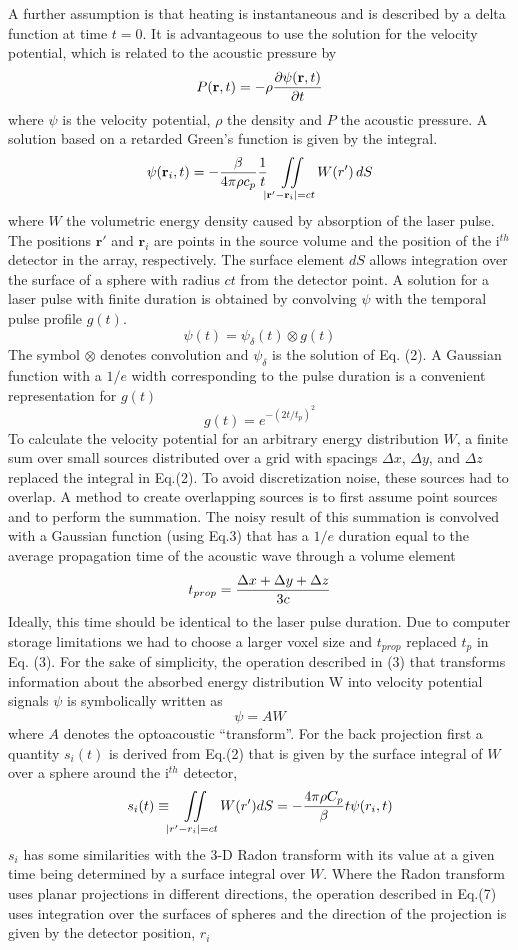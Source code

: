 ﻿\documentclass{article}
\begin{document}
A further assumption 
is that heating is instantaneous and is described by a delta 
function at time $t = 0$. It is advantageous to use 
the solution for the velocity potential, which is related to 
the acoustic pressure by
$$
P(\mathbf{r},t)= - \rho {\partial \psi(\mathbf{r},t)\over \partial t}
$$
where $\psi$ is the velocity potential, $\rho$ the density 
and $P$ the acoustic pressure. A solution based on a retarded Green's 
function is given by the integral.
$$
\psi (\mathbf{r}_i ,t)=-{\beta \over 4\pi\rho c_p } {1\over t}
\iint\limits_{\left| \mathbf{r}'-\mathbf{r}_i \right| =c t} W(r')\,dS
$$
where $W$ the volumetric 
energy density caused by absorption of the laser pulse. The positions
$\mathbf{r}'$ and $\mathbf{r}_i$ 
are points in the source volume and the position of the i$^{th}$ 
detector in the array, respectively. The surface element $dS$ allows 
integration over the surface of a sphere with radius $c t$ from 
the detector point. A solution for a laser pulse with finite 
duration is obtained by convolving $\psi$ with the temporal 
pulse profile $g(t)$. 
$$
\psi (t)=\psi_\delta (t) \otimes g(t)
$$
The symbol $\otimes$ denotes convolution and $\psi_\delta$ 
is the solution of Eq. (2). A Gaussian function 
with a $1/e$ width corresponding to the pulse duration is a
convenient representation for $g(t)$
$$
g(t)=e^{-(2t/t_p )^2}
$$
To calculate the velocity potential 
for an arbitrary energy distribution $W$, a finite sum over small 
sources distributed over a grid with spacings $\Delta x$, $\Delta y$,
and $\Delta z$ replaced the integral in Eq.(2). To avoid discretization 
noise, these sources had to overlap. A method to create overlapping 
sources is to first assume point sources and to perform the summation. 
The noisy result of this summation is convolved with a Gaussian 
function (using Eq.3) that has a $1/e$ duration equal to the average 
propagation time of the acoustic wave through a volume element
$$
t_{prop} ={\Delta x+\Delta y+\Delta z \over 3 c} 
$$
Ideally, this time should be identical to the laser pulse duration. 
Due to computer storage limitations we had to choose a larger 
voxel size and $t_{prop}$ replaced $t_p$ in Eq. (3). For the sake of 
simplicity, the operation described in (3) that transforms information 
about the absorbed energy distribution W into velocity potential 
signals $\psi$ is symbolically written as
$$
\psi =A W
$$
where $A$ denotes the optoacoustic ``transform''. For the back projection 
first a quantity $s_i(t)$ is derived from Eq.(2) that is given 
by the surface integral of $W$ over a sphere around the i$^{th}$ detector,
$$
s_i (t)\equiv \iint\limits_{\left| r' -r_i \right| =c t} W(r' ) dS=
-{4\pi  \rho  C_p \over \beta }   t  \psi (r_i ,t)
$$
$s_i$ has some similarities with the 3-D Radon transform with 
its value at a given time being determined by a surface integral 
over $W$. Where the Radon transform uses planar projections in 
different directions, the operation described in Eq.(7) uses 
integration over the surfaces of spheres and the direction of 
the projection is given by the detector position, $r_i$ 
\end{document}

